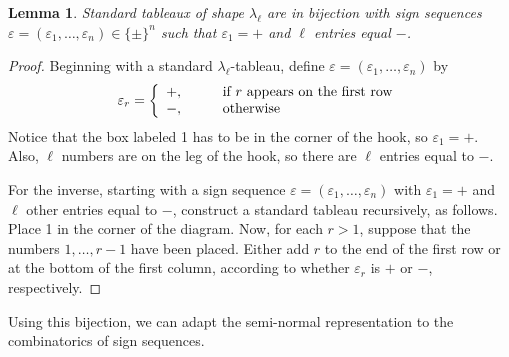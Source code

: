 \documentclass [12pt, letterpaper, oneside] {amsart}
\newcommand \e {\varepsilon}
\renewcommand \l {\lambda}
\theoremstyle {plain}
\newtheorem {lemma} [subsection] {Lemma}
\begin{document}
\begin {lemma} \label {sign seq}
Standard tableaux of shape $\l_\ell$ are in bijection 
with sign sequences $\e =(\e_1,\dots,\e_n)\in \{\pm\}^n$ such that $\e_1 = +$ and
$\ell$ entries equal $-$.
\end {lemma}

\begin {proof}
Beginning with a standard $\l_\ell$-tableau, define $\e = (\e_1, \ldots, \e_n)$ by
\begin {equation}
\e_r = \left\{ \begin {array} {l l}
+, \qquad & \text {if } r \text { appears on the first row} \\
-, \qquad & \text {otherwise}
\end {array} \right.
\end {equation}
Notice that the box labeled 1 has to be in the corner of the hook, so $\e_1 = +$.  Also, $\ell$ numbers are on the leg of the hook, so there are 
$\ell$ entries equal to $-$.

For the inverse, starting with a sign sequence $\e = (\e_1, \ldots, \e_n)$ with $\e_1=+$ and $\ell$ other entries equal to $-$, construct a standard tableau recursively, as follows.  Place 1 in the corner of the diagram.  Now, for each $r>1$, suppose that the numbers $1, \ldots, r-1$ have been placed.  Either add $r$ to the end of the first row or at the bottom of the first column, according to whether $\e_r$ is $+$ or $-$, respectively.
\end {proof}

Using this bijection, we can adapt the semi-normal representation to the combinatorics of sign sequences.
\end{document}
